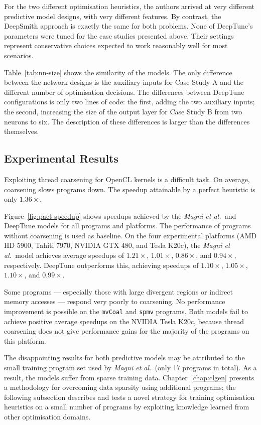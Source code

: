 For the two different optimisation heuristics, the authors arrived at very different predictive model designs, with very different features. By contrast, the DeepSmith approach is exactly the same for both problems. None of DeepTune's parameters were tuned for the case studies presented above. Their settings represent conservative choices expected to work reasonably well for most scenarios.

Table~\ref{tab:nn-size} shows the similarity of the models. The only difference between the network designs is the auxiliary inputs for Case Study A and the different number of optimisation decisions. The differences between DeepTune configurations is only two lines of code: the first, adding the two auxiliary inputs; the second, increasing the size of the output layer for Case Study B from two neurons to six. The description of these differences is larger than the differences themselves.




\subsection{Experimental Results}

Exploiting thread coarsening for OpenCL kernels is a difficult task. On average, coarsening slows programs down. The speedup attainable by a perfect heuristic is only $1.36\times$.

Figure~\ref{fig:pact-speedup} shows speedups achieved by the \emph{Magni et al.\ }and DeepTune models for all programs and platforms. The performance of programs without coarsening is used as baseline. On the four experimental platforms (AMD HD 5900, Tahiti 7970, NVIDIA GTX 480, and Tesla K20c), the \emph{Magni et al.\ }model achieves average speedups of $1.21\times$, $1.01\times$, $0.86\times$, and $0.94\times$, respectively. DeepTune outperforms this, achieving speedups of $1.10\times$, $1.05\times$, $1.10\times$, and $0.99\times$.

Some programs --- especially those with large divergent regions or indirect memory accesses --- respond very poorly to coarsening. No performance improvement is possible on the \texttt{mvCoal} and \texttt{spmv} programs. Both models fail to achieve positive average speedups on the NVIDIA Tesla K20c, because thread coarsening does not give performance gains for the majority of the programs on this platform.

The disappointing results for both predictive models may be attributed to the small training program set used by \emph{Magni et al.\ }(only 17 programs in total). As a result, the models suffer from sparse training data. Chapter~\ref{chap:clgen} presents a methodology for overcoming data sparsity using additional programs; the following subsection describes and tests a novel strategy for training optimisation heuristics on a small number of programs by exploiting knowledge learned from other optimisation domains.


